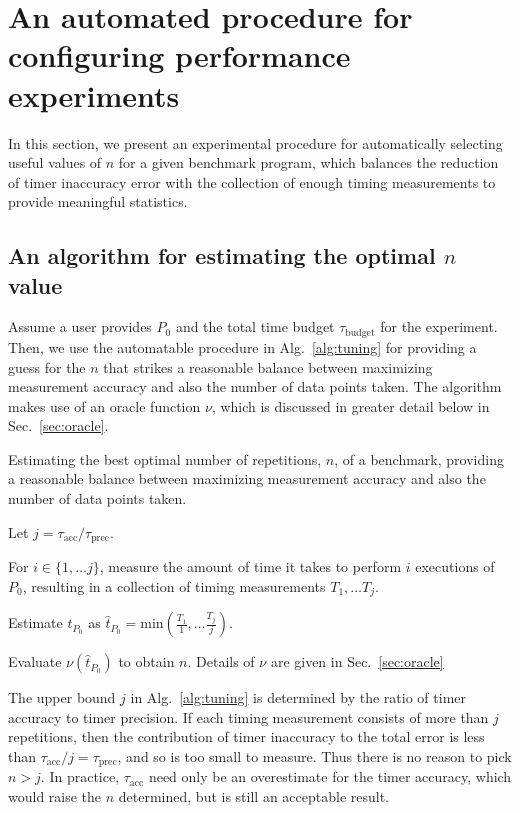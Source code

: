 \documentclass[conference]{IEEEtran}
\begin{document}
\section{An automated procedure for configuring performance experiments}
\label{sec:confexperiment}

In this section, we present an experimental procedure for automatically
selecting useful values of $n$ for a given benchmark program, which balances
the reduction of timer inaccuracy error with the collection of enough timing
measurements to provide meaningful statistics.

\subsection{An algorithm for estimating the optimal $n$ value}

Assume a user provides $P_0$ and the total time budget $\tau_{\textrm{budget}}$
for the experiment. Then, we use the automatable procedure in
Alg.~\ref{alg:tuning} for providing a guess for the $n$ that strikes a
reasonable balance between maximizing measurement accuracy and also the number
of data points taken. The algorithm makes use of an oracle function $\nu$,
which is discussed in greater detail below in Sec.~\ref{sec:oracle}.

\begin{algorithm}
    \caption{Estimating the best optimal number of repetitions, $n$, of a
benchmark, providing a reasonable balance between maximizing measurement
accuracy and also the number of data points taken.}
    \label{alg:tuning}
    Let $j = \tau_{\textrm{acc}} / \tau_{\textrm{prec}}$.

    For $i \in \{1, \dots j\}$, measure the amount of time it takes to perform $i$
    executions of $P_0$, resulting in a collection of timing measurements $T_1, \dots T_j$.

    Estimate $t_{P_0}$ as $\hat{t}_{P_0} = \textrm{min}(\frac{T_1}{1}, \dots \frac{T_j}{j})$.

    Evaluate $\nu(\hat{t}_{P_0})$ to obtain $n$. Details of $\nu$ are given in Sec.~\ref{sec:oracle}
\end{algorithm}

The upper bound $j$ in Alg.~\ref{alg:tuning} is determined by the ratio of
timer accuracy to timer precision. If each timing measurement consists of more
than $j$ repetitions, then the contribution of timer inaccuracy to the total
error is less than $\tau_\textrm{acc} / j = \tau_\textrm{prec}$, and so is too
small to measure. Thus there is no reason to pick $n > j$. In practice,
$\tau_\textrm{acc}$ need only be an overestimate for the timer accuracy, which
would raise the $n$ determined, but is still an acceptable result.
\end{document}
